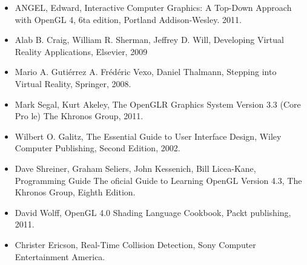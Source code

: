 \documentclass[a4paper,11pt]{article}
\theoremstyle{mytheor}
\begin{document}
\begin{itemize}
	\item ANGEL, Edward, Interactive Computer Graphics: A Top-Down Approach
with OpenGL 4, 6ta edition, Portland
Addison-Wesley. 2011.
	\item Alab B. Craig, William R. Sherman, Jeffrey D. Will, Developing Virtual
Reality Applications, Elsevier, 2009
	\item Mario A. Gutiérrez A. Frédéric Vexo, Daniel Thalmann, Stepping into Virtual
Reality, Springer, 2008.
	\item Mark Segal, Kurt Akeley, The OpenGLR Graphics System Version 3.3 (Core
Pro le) The Khronos Group, 2011.
	\item Wilbert O. Galitz, The Essential Guide to User Interface Design, Wiley
Computer Publishing, Second Edition, 2002.
	\item Dave Shreiner, Graham Seliers, John Kessenich, Bill Licea-Kane,
Programming Guide The oficial Guide to Learning
OpenGL Version
4.3, The Khronos Group, Eighth Edition.
	\item David Wolff, OpenGL 4.0 Shading Language Cookbook, Packt publishing,
2011.
	\item Christer Ericson, Real-Time Collision Detection, Sony Computer
Entertainment America.
\end{itemize}
\end{document}
